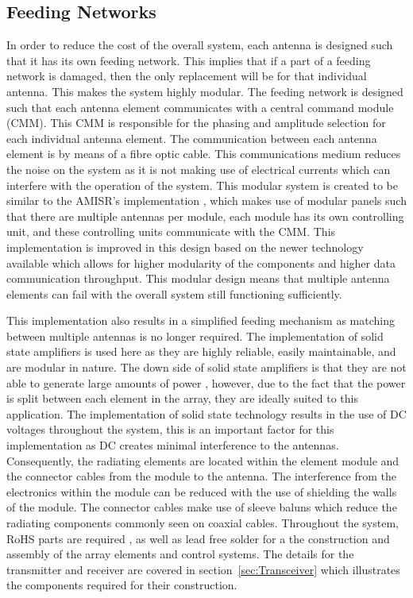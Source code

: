 \documentclass[11pt]{witseiepaper}
\begin{document}
\begin{bibunit}[witseie]
\subsection{Feeding Networks} \label{sec:FeedingNetworks}
In order to reduce the cost of the overall system, each antenna is designed such that it has its own feeding network. This implies that if a part of a feeding network is damaged, then the only replacement will be for that individual antenna. This makes the system highly modular. 
The feeding network is designed such that each antenna element communicates with a central command module (CMM). This CMM is responsible for the phasing and amplitude selection for each individual antenna element.
The communication between each antenna element is by means of a fibre optic cable. This communications medium reduces the noise on the system as it is not making use of electrical currents which can interfere with the operation of the system.
This modular system is created to be similar to the AMISR's implementation \cite{AMISR}, which makes use of modular panels such that there are multiple antennas per module, each module has its own controlling unit, and these controlling units communicate with the CMM.
This implementation is improved in this design based on the newer technology available which allows for higher modularity of the components and higher data communication throughput.
This modular design means that multiple antenna elements can fail with the overall system still functioning sufficiently.

This implementation also results in a simplified feeding mechanism as matching between multiple antennas is no longer required.
The implementation of solid state amplifiers is used here as they are highly reliable, easily maintainable, and are modular in nature. The down side of solid state amplifiers is that they are not able to generate large amounts of power \cite[p.~364]{radarHandbook}, however, due to the fact that the power is split between each element in the array, they are ideally suited to this application. The implementation of solid state technology results in the use of DC voltages throughout the system, this is an important factor for this implementation as DC creates minimal interference to the antennas.
Consequently, the radiating elements are located within the element module and the connector cables from the module to the antenna.
The interference from the electronics within the module can be reduced with the use of shielding the walls of the module. The connector cables make use of sleeve baluns which reduce the radiating components commonly seen on coaxial cables.
Throughout the system, RoHS parts are required \cite{RoHS}, as well as lead free solder for a the construction and assembly of the array elements and control systems. 
The details for the transmitter and receiver are covered in section~\ref{sec:Transceiver} which illustrates the components required for their construction.


\end{bibunit}
\end{document}
